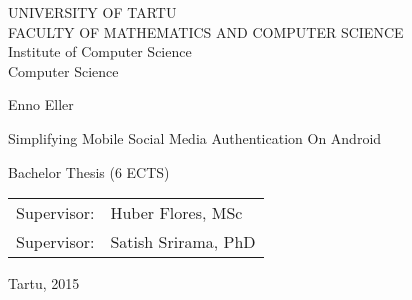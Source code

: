 \begin{titlepage}

\begin{center}

\large
UNIVERSITY OF TARTU\\[2mm]
 
\uppercase{Faculty of Mathematics and Computer Science}\\[2mm]
Institute of Computer Science\\
Computer Science\\[2mm]

\vspace{25mm}


\Large Enno Eller

\vspace{4mm}

\huge Simplifying Mobile Social Media Authentication On Android

\vspace{20mm}

\Large Bachelor Thesis (6 ECTS)

\end{center}

\vspace{2mm}

\begin{flushright}
 {
 \setlength{\extrarowheight}{5pt}
 \begin{tabular}{r l} 
  \sffamily Supervisor: & \sffamily Huber Flores, MSc \\
  \sffamily Supervisor: & \sffamily Satish Srirama, PhD
 \end{tabular}
 }
\end{flushright}

\vfill

\centerline{Tartu, 2015}

\end{titlepage}
